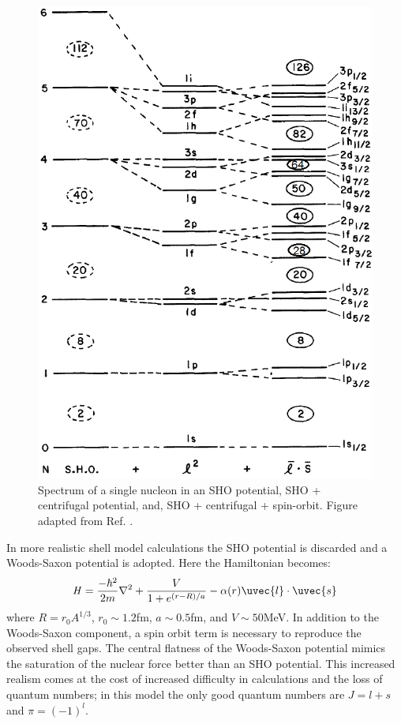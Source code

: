 \begin{figure}
\centerline{\includegraphics[height=0.45\textheight]{./img/c2/shell_model.png}}
	\caption{Spectrum of a single nucleon in an SHO potential, SHO + centrifugal potential, and, SHO + centrifugal + spin-orbit. Figure adapted from Ref. \cite{casten}.\label{fig:chp2-shell-model}}
\end{figure}


In more realistic shell model calculations the SHO potential is discarded and a Woods-Saxon potential is adopted. Here the Hamiltonian becomes:
\begin{equation}
\label{eqn:chp2-sm-ws-hamil}
\mathbf{\mathit{H}} = \frac{-\hbar^2}{2m}\nabla^2 + \frac{V}{1+e^{(r-R)/a}} - \alpha(r)\uvec{l}\cdot\uvec{s}
\end{equation}
where $R=r_0A^{1/3}$, $r_0\sim1.2$fm, $a\sim0.5$fm, and $V\sim50$MeV. In addition to the Woods-Saxon component, a spin orbit term is necessary to reproduce the observed shell gaps. The central flatness of the Woods-Saxon potential mimics the saturation of the nuclear force better than an SHO potential. This increased realism comes at the cost of increased difficulty in calculations and the loss of quantum numbers; in this model the only good quantum numbers are $J=\mathit{l}+\mathit{s}$ and $\pi = (-1)^\mathit{l}$.

